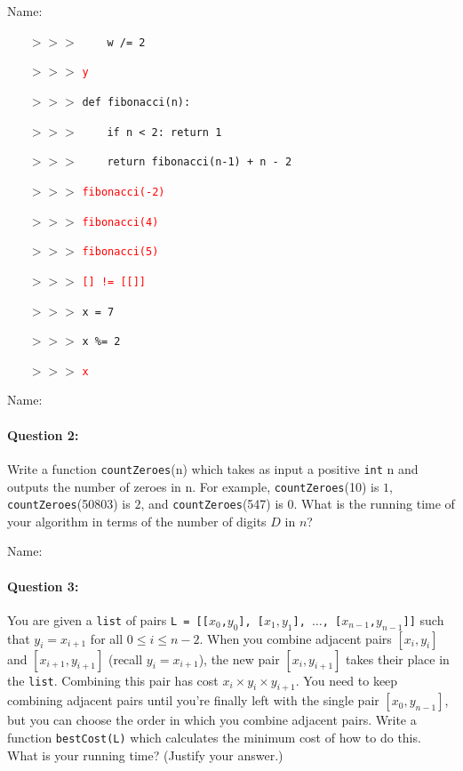 \documentclass[11pt]{article}
\newcommand{\ans}[1]{\textcolor{red}{#1}}
\begin{document}
\noindent Name:

\begin{itemize}
\item[$>>>$] \ \ \ \ \texttt{w /= 2}
\item[$>>>$] \ans{\texttt{y}}
\item[]
\item[$>>>$] \texttt{def fibonacci(n):}
\item[$>>>$] \ \ \ \ \texttt{if n < 2: return 1}
\item[$>>>$] \ \ \ \ \texttt{return fibonacci(n-1) + n - 2}
\item[$>>>$]\ans{\texttt{fibonacci(-2)}}
\item[]
\item[$>>>$]\ans{\texttt{fibonacci(4)}}
\item[]
\item[$>>>$]\ans{\texttt{fibonacci(5)}}
\item[]
\item[$>>>$]\ans{\texttt{[] != [[]]}}
\item[]
\item[$>>>$]\texttt{x = 7}
\item[$>>>$]\texttt{x \%= 2}
\item[$>>>$]\ans{\texttt{x}}
\end{itemize}

\newpage

\noindent Name:

\paragraph{Question 2:}
Write a function \texttt{countZeroes}(n) which takes as input a
positive
\texttt{int} n and outputs the number of zeroes in n.  For example,
\texttt{countZeroes}(10) is $1$, \texttt{countZeroes}(50803) is $2$,
and \texttt{countZeroes}(547) is $0$. What is the running time of
your algorithm in terms of the number of digits $D$ in $n$?

\newpage

\noindent Name:

\paragraph{Question 3:}
You are given a \texttt{list} of pairs \texttt{L = [[$x_0$,$y_0$],
  [$x_1,y_1$], $\ldots$, [$x_{n-1}$,$y_{n-1}$]]} such that $y_i =
x_{i+1}$ for all $0\le i \le n-2$.  When you combine adjacent pairs
\texttt{$[x_i,y_i]$} and \texttt{$[x_{i+1},y_{i+1}]$} (recall
\texttt{$y_i = x_{i+1}$}), the new pair
\texttt{$[x_i,y_{i+1}]$} takes their place in the \texttt{list}.
Combining this pair has cost $x_i\times y_i
\times y_{i+1}$.  You need to keep combining adjacent pairs until
you're finally left with the single pair \texttt{$[x_0,y_{n-1}]$}, but
you can choose the order in which you combine adjacent pairs.
Write a function \texttt{bestCost(L)} which calculates the minimum
cost of how to do this. 
What is your running time? (Justify your answer.)
\end{document}
